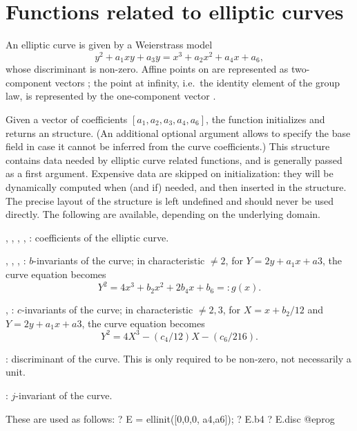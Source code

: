 \section{Functions related to elliptic curves}

An elliptic curve is given by a Weierstrass model
$$
  y^2+a_1xy+a_3y=x^3+a_2x^2+a_4x+a_6,
$$
whose discriminant is non-zero. Affine points on  are represented as
two-component vectors \kbd{[x,y]}; the point at infinity, i.e.~the identity
element of the group law, is represented by the one-component vector
\kbd{[0]}.

Given a vector of coefficients $[a_1,a_2,a_3,a_4,a_6]$, the function
 initializes and returns an  structure. (An additional
optional argument allows to specify the base field in case it cannot be
inferred from the curve coefficients.) This structure contains data needed by
elliptic curve related functions, and is generally passed as a first argument.
Expensive data are skipped on initialization: they will be dynamically
computed when (and if) needed, and then inserted in the structure. The
precise layout of the  structure is left undefined and should never
be used directly. The following  are available,
depending on the underlying domain.


\item {}, , , , : coefficients of the
elliptic curve.

\item {}, , , : $b$-invariants of the curve; in
characteristic $\neq 2$, for $Y = 2y + a_1x+a3$, the curve equation becomes
$$ Y^2 = 4 x^3 + b_2 x^2 + 2b_4 x + b_6 =: g(x). $$

\item {}, : $c$-invariants of the curve; in characteristic $\neq
2,3$, for $X = x + b_2/12$ and $Y = 2y + a_1x+a3$, the curve equation becomes
$$ Y^2 = 4 X^3 - (c_4/12) X - (c_6/216). $$

\item {}: discriminant of the curve. This is only required to be
non-zero, not necessarily a unit.

\item {}: $j$-invariant of the curve.

\noindent These are used as follows:
\bprog
? E = ellinit([0,0,0, a4,a6]);
? E.b4
? E.disc
@eprog

